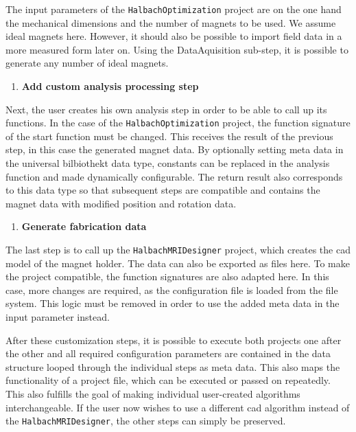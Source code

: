 The input parameters of the
\passthrough{\lstinline!HalbachOptimization!}\cite{HalbachOptimization}
project are on the one hand the mechanical dimensions and the number of
magnets to be used. We assume ideal magnets here. However, it should
also be possible to import field data in a more measured form later on.
Using the DataAquisition sub-step, it is possible to generate any number
of ideal magnets.

\begin{enumerate}
\def\labelenumi{\arabic{enumi}.}
\setcounter{enumi}{1}
\tightlist
\item
  \textbf{Add custom analysis processing step}
\end{enumerate}

Next, the user creates his own analysis step in order to be able to call
up its functions. In the case of the
\passthrough{\lstinline!HalbachOptimization!}\cite{HalbachOptimization}
project, the function signature of the start function must be changed.
This receives the result of the previous step, in this case the
generated magnet data. By optionally setting meta data in the universal
bilbiothekt data type, constants can be replaced in the analysis
function and made dynamically configurable. The return result also
corresponds to this data type so that subsequent steps are compatible
and contains the magnet data with modified position and rotation data.

\begin{enumerate}
\def\labelenumi{\arabic{enumi}.}
\setcounter{enumi}{2}
\tightlist
\item
  \textbf{Generate fabrication data}
\end{enumerate}

The last step is to call up the
\passthrough{\lstinline!HalbachMRIDesigner!}\cite{HalbachMRIDesigner}
project, which creates the \gls{cad} model of the magnet holder. The
data can also be exported as files here. To make the project compatible,
the function signatures are also adapted here. In this case, more
changes are required, as the configuration file is loaded from the file
system. This logic must be removed in order to use the added meta data
in the input parameter instead.

After these customization steps, it is possible to execute both projects
one after the other and all required configuration parameters are
contained in the data structure looped through the individual steps as
meta data. This also maps the functionality of a project file, which can
be executed or passed on repeatedly. This also fulfills the goal of
making individual user-created algorithms interchangeable. If the user
now wishes to use a different \gls{cad} algorithm instead of the
\passthrough{\lstinline!HalbachMRIDesigner!}\cite{HalbachMRIDesigner},
the other steps can simply be preserved.


